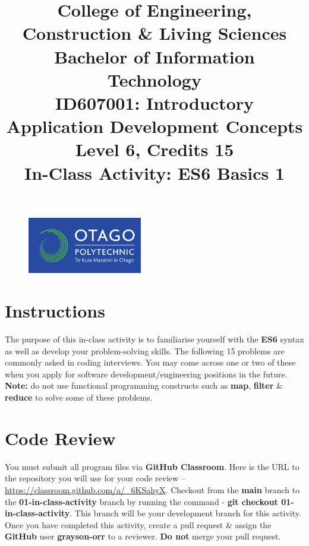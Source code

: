 \documentclass{article}
\author{}
\begin{document}
\begin{figure}
	\centering
	\includegraphics[width=50mm]{../img/logo.png}
\end{figure}

\title{College of Engineering, Construction \& Living Sciences\\Bachelor of Information Technology\\ID607001: Introductory Application Development Concepts\\Level 6, Credits 15\\\textbf{In-Class Activity: ES6 Basics 1}}
\date{}
\maketitle
 
\section*{Instructions}
The purpose of this in-class activity is to familiarise yourself with the \textbf{ES6} syntax as well as develop your problem-solving skills. The following 15 problems are commonly asked in coding interviews. You may come across one or two of these when you apply for software development/engineering positions in the future. \textbf{Note:} do not use functional programming constructs such as \textbf{map}, \textbf{filter} \& \textbf{reduce} to solve some of these problems.

\section*{Code Review}
You must submit all program files via \textbf{GitHub Classroom}. Here is the URL to the repository you will use for your code review – \href{https://classroom.github.com/a/\_6KSahyX}{https://classroom.github.com/a/\_6KSahyX}. Checkout from the \textbf{main} branch to the \textbf{01-in-class-activity} branch by running the command - \textbf{git checkout 01-in-class-activity}. This branch will be your development branch for this activity. Once you have completed this activity, create a pull request \& assign the \textbf{GitHub} user \textbf{grayson-orr} to a reviewer. \textbf{Do not} merge your pull request.
\end{document}
